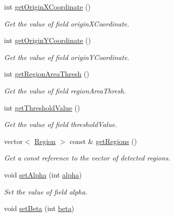 \begin{DoxyCompactItemize}
int \hyperlink{classmultiscale_1_1analysis_1_1RegionDetector_aea7192e8394c264e623be52c44f6a986}{get\-Origin\-X\-Coordinate} ()
\begin{DoxyCompactList}\small\item\em Get the value of field origin\-X\-Coordinate. \end{DoxyCompactList}\item 
int \hyperlink{classmultiscale_1_1analysis_1_1RegionDetector_a332fc0877bbad43858acd175833ce4d6}{get\-Origin\-Y\-Coordinate} ()
\begin{DoxyCompactList}\small\item\em Get the value of field origin\-Y\-Coordinate. \end{DoxyCompactList}\item 
int \hyperlink{classmultiscale_1_1analysis_1_1RegionDetector_a376ab8398852d02f3f4f2f5ffa4ec34b}{get\-Region\-Area\-Thresh} ()
\begin{DoxyCompactList}\small\item\em Get the value of field region\-Area\-Thresh. \end{DoxyCompactList}\item 
int \hyperlink{classmultiscale_1_1analysis_1_1RegionDetector_aa429084aca1e04ec288878822e33bf36}{get\-Threshold\-Value} ()
\begin{DoxyCompactList}\small\item\em Get the value of field threshold\-Value. \end{DoxyCompactList}\item 
vector$<$ \hyperlink{classmultiscale_1_1analysis_1_1Region}{Region} $>$ const \& \hyperlink{classmultiscale_1_1analysis_1_1RegionDetector_ab24abc7d629de96a342fe4f056f7d48c}{get\-Regions} ()
\begin{DoxyCompactList}\small\item\em Get a const reference to the vector of detected regions. \end{DoxyCompactList}\item 
void \hyperlink{classmultiscale_1_1analysis_1_1RegionDetector_ada64f919fd5310987b950c052a3cf93a}{set\-Alpha} (int \hyperlink{classmultiscale_1_1analysis_1_1RegionDetector_ab768a3bbfff9835b441a889ab2cb05a6}{alpha})
\begin{DoxyCompactList}\small\item\em Set the value of field alpha. \end{DoxyCompactList}\item 
void \hyperlink{classmultiscale_1_1analysis_1_1RegionDetector_a054b6327918fd9a6ff2de293dac1afc0}{set\-Beta} (int \hyperlink{classmultiscale_1_1analysis_1_1RegionDetector_a23c831170c2264dd7e59067a1a7d3c8e}{beta})

\end{DoxyCompactItemize}
